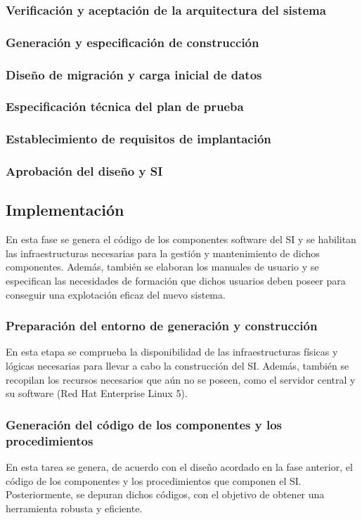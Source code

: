 \documentclass[11pt,a4paper,spanish,twoside]{book}
\begin{document}
\subsubsection{Verificación y aceptación de la arquitectura del sistema}
\subsubsection{Generación y especificación de construcción}
\subsubsection{Diseño de migración y carga inicial de datos}
\subsubsection{Especificación técnica del plan de prueba}
\subsubsection{Establecimiento de requisitos de implantación}
\subsubsection{Aprobación del diseño y SI}

\subsection{Implementación}
En esta fase se genera el código de los componentes software del SI y se 
habilitan las infraestructuras necesarias para la gestión y mantenimiento de 
dichos componentes. Además, también se elaboran los manuales de usuario y se 
especifican las necesidades de formación que dichos usuarios deben poseer 
para conseguir una explotación eficaz del nuevo sistema.

\subsubsection{Preparación del entorno de generación y construcción}
En esta etapa se comprueba la disponibilidad de las infraestructuras físicas 
y lógicas necesarias para llevar a cabo la construcción del SI. Además, también
se recopilan los recursos necesarios que aún no se poseen, como el servidor 
central y su software (Red Hat Enterprise Linux 5).

\subsubsection{Generación del código de los componentes y los 
procedimientos}
En esta tarea se genera, de acuerdo con el diseño acordado en la fase 
anterior, el código de los componentes y los procedimientos que componen el SI.
Posteriormente, se depuran dichos códigos, con el objetivo de obtener una 
herramienta robusta y eficiente.
\end{document}
